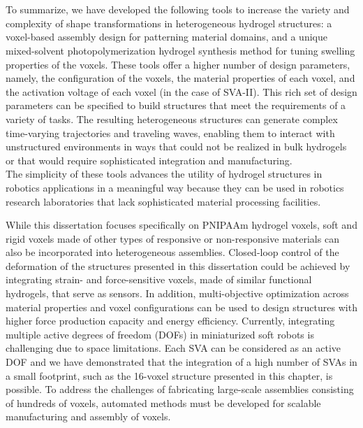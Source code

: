\section{}
To summarize, we have developed the following tools to increase the variety and complexity of shape transformations in heterogeneous hydrogel structures: a voxel-based assembly design for patterning material domains, and a unique mixed-solvent photopolymerization hydrogel synthesis method for tuning swelling properties of the voxels. These tools offer a higher number of design parameters, namely, the configuration of the voxels, the material properties of each voxel, and the activation voltage of each voxel (in the case of SVA-II). This rich set of design parameters can be specified to build structures that meet the requirements of a variety of tasks. The resulting heterogeneous structures can generate complex time-varying trajectories and traveling waves, enabling them to interact with unstructured environments in ways that could not be realized in bulk hydrogels or that would require sophisticated integration and manufacturing.\\

The simplicity of these tools advances the utility of hydrogel structures in robotics applications in a meaningful way because they can be used in robotics research laboratories that lack sophisticated material processing facilities.

While this dissertation focuses specifically on PNIPAAm hydrogel voxels, soft and rigid voxels made of other types of responsive or non-responsive materials can also be incorporated into heterogeneous assemblies. Closed-loop control of the deformation of the structures presented in this dissertation could be achieved by integrating strain- and force-sensitive voxels, made of similar functional hydrogels, that serve as sensors. In addition, multi-objective optimization across material properties and voxel configurations can be used to design structures with higher force production capacity and %
energy efficiency. Currently, integrating multiple active degrees of freedom (DOFs) in miniaturized soft robots is challenging due to space limitations. Each SVA can be considered as an active DOF and we have demonstrated that the integration of a high number of SVAs in a small footprint, such as the 16-voxel structure presented in this chapter, is possible. To address the challenges of fabricating large-scale 
assemblies consisting of hundreds of voxels, %
automated methods must be developed for scalable manufacturing and assembly of voxels.